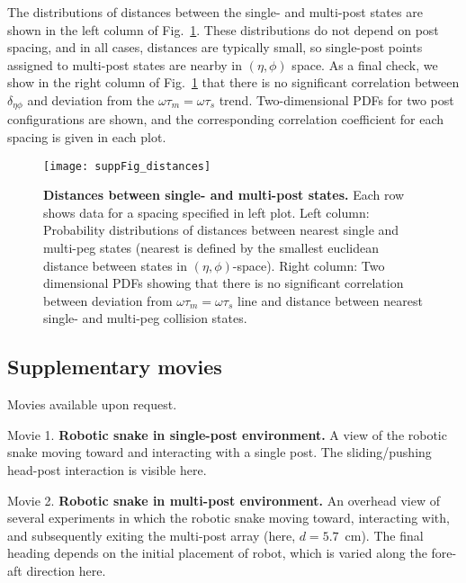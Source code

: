\documentclass[aps,pre,twocolumn,superscriptaddress]{revtex4-1}
\begin{document}
The distributions of distances between the single- and multi-post states are shown in the left column of Fig.~\ref{fig:distances}. These distributions do not depend on post spacing, and in all cases, distances are typically small, so single-post points assigned to multi-post states are nearby in $(\eta,\phi)$ space. As a final check, we show in the right column of Fig.~\ref{fig:distances} that there is no significant correlation between $\delta_{\eta\phi}$ and deviation from the $\omega \tau_m = \omega \tau_s$ trend. Two-dimensional PDFs for two post configurations are shown, and the corresponding correlation coefficient for each spacing is given in each plot.   



\begin{figure}[h!]
	\texttt{[image: suppFig\_distances]}
	\caption{\textbf{Distances between single- and multi-post states.} Each row shows data for a spacing specified in left plot. Left column: Probability distributions of distances between nearest single and multi-peg states (nearest is defined by the smallest euclidean distance between states in $(\eta,\phi)$-space). Right column: Two dimensional PDFs showing that there is no significant correlation between deviation from $\omega \tau_m = \omega \tau_s$ line and distance between nearest single- and multi-peg collision states. }
	\label{fig:distances}
\end{figure}



\clearpage
\subsection{Supplementary movies}
\vspace{5mm}
Movies available upon request. %
\vspace{5mm}

Movie 1. \textbf{Robotic snake in single-post environment.} A view of the robotic snake moving toward and interacting with a single post.  The sliding/pushing head-post interaction is visible here.
\label{mov:singlePostRobot}
\vspace{5mm}

Movie 2. \textbf{Robotic snake in multi-post environment.} An overhead view of several experiments in which the robotic snake moving toward, interacting with, and subsequently exiting the multi-post array (here, $d = 5.7$~cm). The final heading depends on the initial placement of robot, which is varied along the fore-aft direction here. 
\label{mov:multiPostRobot}
\vspace{5mm}
\end{document}
